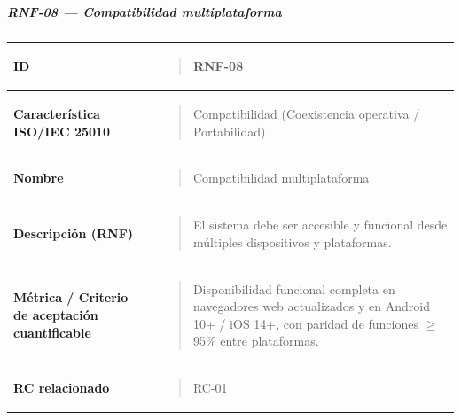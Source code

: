 \documentclass[
]{article}
\newcounter{none} %
\begin{document}
\subparagraph{RNF-08 --- Compatibilidad
multiplataforma}\label{rnf-08-compatibilidad-multiplataforma}

{\def\LTcaptype{none} %
\begin{longtable}[]{@{}
  >{\raggedright\arraybackslash}p{}
  >{\raggedright\arraybackslash}p{}@{}}
\toprule\noalign{}
\begin{minipage}[b]{\linewidth}\raggedright
\textbf{ID}
\end{minipage} & \begin{minipage}[b]{\linewidth}\raggedright
\begin{quote}
RNF-08
\end{quote}
\end{minipage} \\
\midrule\noalign{}
\endhead
\bottomrule\noalign{}
\endlastfoot
\textbf{Característica ISO/IEC 25010} & \begin{minipage}[t]{\linewidth}\raggedright
\begin{quote}
Compatibilidad (Coexistencia operativa / Portabilidad)
\end{quote}
\end{minipage} \\
\textbf{Nombre} & \begin{minipage}[t]{\linewidth}\raggedright
\begin{quote}
Compatibilidad multiplataforma
\end{quote}
\end{minipage} \\
\textbf{Descripción (RNF)} & \begin{minipage}[t]{\linewidth}\raggedright
\begin{quote}
El sistema debe ser accesible y funcional desde múltiples dispositivos
y plataformas.
\end{quote}
\end{minipage} \\
\textbf{Métrica / Criterio de aceptación cuantificable} & \begin{minipage}[t]{\linewidth}\raggedright
\begin{quote}
Disponibilidad funcional completa en navegadores web actualizados y en
Android 10+ / iOS 14+, con paridad de funciones \(\geq\) 95\% entre
plataformas.
\end{quote}
\end{minipage} \\
\textbf{RC relacionado} & \begin{minipage}[t]{\linewidth}\raggedright
\begin{quote}
RC-01
\end{quote}
\end{minipage} \\
\end{longtable}
}
\end{document}
